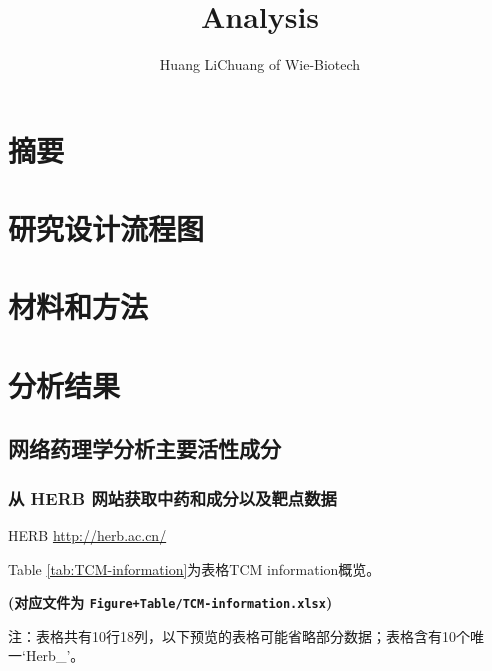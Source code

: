 \documentclass[
]{article}
\title{Analysis}
\author{Huang LiChuang of Wie-Biotech}
\date{}
\begin{document}
\maketitle

{
\setcounter{tocdepth}{3}
\tableofcontents
}
\listoffigures

\listoftables

\hypertarget{abstract}{%
\section{摘要}\label{abstract}}

\hypertarget{route}{%
\section{研究设计流程图}\label{route}}

\hypertarget{methods}{%
\section{材料和方法}\label{methods}}

\hypertarget{results}{%
\section{分析结果}\label{results}}

\hypertarget{ux7f51ux7edcux836fux7406ux5b66ux5206ux6790ux4e3bux8981ux6d3bux6027ux6210ux5206}{%
\subsection{网络药理学分析主要活性成分}\label{ux7f51ux7edcux836fux7406ux5b66ux5206ux6790ux4e3bux8981ux6d3bux6027ux6210ux5206}}

\hypertarget{ux4ece-herb-ux7f51ux7ad9ux83b7ux53d6ux4e2dux836fux548cux6210ux5206ux4ee5ux53caux9776ux70b9ux6570ux636e}{%
\subsubsection{从 HERB 网站获取中药和成分以及靶点数据}\label{ux4ece-herb-ux7f51ux7ad9ux83b7ux53d6ux4e2dux836fux548cux6210ux5206ux4ee5ux53caux9776ux70b9ux6570ux636e}}

HERB \url{http://herb.ac.cn/}

Table \ref{tab:TCM-information}为表格TCM information概览。

\textbf{(对应文件为 \texttt{Figure+Table/TCM-information.xlsx})}

\begin{center}\begin{tcolorbox}[colback=gray!10, colframe=gray!50, width=0.9\linewidth, arc=1mm, boxrule=0.5pt]注：表格共有10行18列，以下预览的表格可能省略部分数据；表格含有10个唯一`Herb\_'。
\end{tcolorbox}
\end{center}
\end{document}
